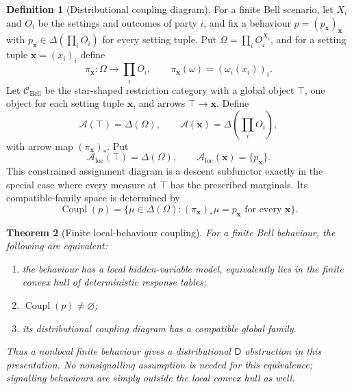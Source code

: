 \documentclass[11pt]{article}
\theoremstyle{plain}
\newtheorem{theorem}{Theorem}[section]
\theoremstyle{definition}
\newtheorem{definition}[theorem]{Definition}
\theoremstyle{remark}
\newcommand{\LocalAdm}{\mathcal{A}_{\mathrm{loc}}}
\begin{document}
\begin{definition}[Distributional coupling diagram]\label{def:bellpack}
For a finite Bell scenario, let $X_i$ and $O_i$ be the settings and outcomes of
party $i$, and fix a behaviour $p=(p_{\mathbf x})_{\mathbf x}$ with
$p_{\mathbf x}\in\Delta(\prod_iO_i)$ for every setting tuple. Put
$\Omega=\prod_iO_i^{X_i}$, and for a setting tuple
$\mathbf x=(x_i)_i$ define
\[
\pi_{\mathbf x}:\Omega\to\prod_iO_i,
\qquad
\pi_{\mathbf x}(\omega)=(\omega_i(x_i))_i.
\]
Let $\mathcal C_{\mathrm{Bell}}$ be the star-shaped restriction category with a
global object $\top$, one object for each setting tuple $\mathbf x$, and arrows
$\top\to\mathbf x$. Define
\[
\mathcal A(\top)=\Delta(\Omega),
\qquad
\mathcal A(\mathbf x)=\Delta\!\left(\prod_iO_i\right),
\]
with arrow map $(\pi_{\mathbf x})_*$. Put
\[
\LocalAdm(\top)=\Delta(\Omega),
\qquad
\LocalAdm(\mathbf x)=\{p_{\mathbf x}\}.
\]
This constrained assignment diagram is a descent subfunctor exactly in the
special case where every measure at $\top$ has the prescribed marginals. Its
compatible-family space is determined by
\[
\operatorname{Coupl}(p)=
\{\mu\in\Delta(\Omega):
(\pi_{\mathbf x})_*\mu=p_{\mathbf x}
\text{ for every }\mathbf x\}.
\]
\end{definition}

\begin{theorem}[Finite local-behaviour coupling]\label{thm:bell}
For a finite Bell behaviour, the following are equivalent:
\begin{enumerate}[label=(\roman*)]
\item the behaviour has a local hidden-variable model, equivalently lies in the
finite convex hull of deterministic response tables;
\item $\operatorname{Coupl}(p)\ne\varnothing$;
\item its distributional coupling diagram has a compatible global family.
\end{enumerate}
Thus a nonlocal finite behaviour gives a distributional $\mathsf D$ obstruction
in this presentation. No nonsignalling assumption is needed for this equivalence;
signalling behaviours are simply outside the local convex hull as well.
\end{theorem}
\end{document}
